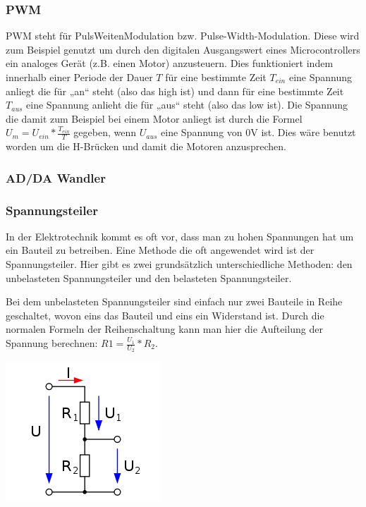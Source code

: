 \documentclass[notitlepage]{report}
\begin{document}
\subsubsection{PWM}

PWM steht f\"{u}r PulsWeitenModulation bzw. Pulse-Width-Modulation. Diese wird zum Beispiel genutzt um durch den digitalen Ausgangswert eines Microcontrollers ein analoges Ger\"{a}t (z.B. einen Motor) anzusteuern. Dies funktioniert indem innerhalb einer Periode der Dauer $T$ f\"{u}r eine bestimmte Zeit $T_{ein}$ eine Spannung anliegt die f\"{u}r „an“ steht (also das high ist) und dann f\"{u}r eine bestimmte Zeit $T_{aus}$ eine Spannung anlieht die f\"{u}r „aus“ steht (also das low ist). Die Spannung die damit zum Beispiel bei einem Motor anliegt ist durch die Formel $U_m = U_{ein} * \frac{T_{ein}}{T}$ gegeben, wenn $U_{aus}$ eine Spannung von 0V ist. Dies w\"{a}re benutzt worden um die H-Br\"{u}cken und damit die Motoren anzusprechen.

\subsubsection{AD/DA Wandler}

\subsubsection{Spannungsteiler}

In der Elektrotechnik kommt es oft vor, dass man zu hohen Spannungen hat um ein Bauteil zu betreiben. Eine Methode die oft angewendet wird ist der Spannungsteiler. Hier gibt es zwei grundsätzlich unterschiedliche Methoden: den unbelasteten Spannungsteiler und den belasteten Spannungsteiler. 

Bei dem unbelasteten Spannungsteiler sind einfach nur zwei Bauteile in Reihe geschaltet, wovon eins das Bauteil und eins ein Widerstand ist. Durch die normalen Formeln der Reihenschaltung kann man hier die Aufteilung der Spannung berechnen: $R1 = \frac{U_1}{U_2} * R_2$. 

\includegraphics[scale=1]{Spannungsteiler_un.png}
\end{document}
